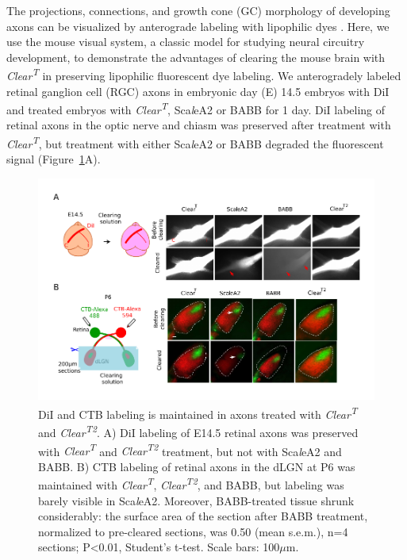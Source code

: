 The projections, connections, and growth cone (GC) morphology of developing axons can be visualized by anterograde labeling with lipophilic dyes \cite{bielle2011emergent,little2009specificity}.
Here, we use the mouse visual system, a classic model for studying neural circuitry development, to demonstrate the advantages of clearing the mouse brain with \emph{Clear\textsuperscript{T}} in preserving lipophilic fluorescent dye labeling.
We anterogradely labeled retinal ganglion cell (RGC) axons in embryonic day (E) 14.5 embryos with DiI and treated embryos with \emph{Clear\textsuperscript{T}}, Sca\emph{l}eA2 or BABB for 1 day.
DiI labeling of retinal axons in the optic nerve and chiasm was preserved after treatment with \emph{Clear\textsuperscript{T}}, but treatment with either Sca\emph{l}eA2 or BABB degraded the fluorescent signal (Figure~\ref{ClearT_SFig2}A).
\begin{figure}[hbtp]
    \begin{center}
        \includegraphics{Figures/ClearT_SFig2}
        \caption[DiI and CTB labeling is maintained in axons treated with \emph{Clear\textsuperscript{T}} and \emph{Clear\textsuperscript{T2}}.]
        {DiI and CTB labeling is maintained in axons treated with \emph{Clear\textsuperscript{T}} and \emph{Clear\textsuperscript{T2}}.
		A) DiI labeling of E14.5 retinal axons was preserved with \emph{Clear\textsuperscript{T}} and \emph{Clear\textsuperscript{T2}} treatment, but not with Sca\emph{l}eA2 and BABB.
		B) CTB labeling of retinal axons in the dLGN at P6 was maintained with \emph{Clear\textsuperscript{T}}, \emph{Clear\textsuperscript{T2}}, and BABB, but labeling was barely visible in Sca\emph{l}eA2.
		Moreover, BABB-treated tissue shrunk considerably: the surface area of the section after BABB treatment, normalized to pre-cleared sections, was 0.50 (mean \pm s.e.m.), n=4 sections; P<0.01, Student’s t-test.
		Scale bars: 100$\mu$m.
		}
        \label{ClearT_SFig2}
    \end{center}
\end{figure}


